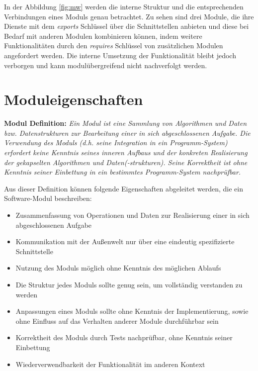     In der Abbildung \ref{fig:mw} werden die interne Struktur und die entsprechenden Verbindungen eines Moduls genau betrachtet. Zu sehen sind drei Module, die ihre Dienste mit dem \textit{exports} Schlüssel über die Schnittstellen anbieten und diese bei Bedarf mit anderen Modulen kombinieren können, indem weitere Funktionalitäten durch den \textit{requires} Schlüssel von zusätzlichen Modulen angefordert werden. Die interne Umsetzung der Funktionalität bleibt jedoch verborgen und kann modulübergreifend nicht nachverfolgt werden. 

  \section{Moduleigenschaften} \label{sec:ME}

    \textbf{Modul Definition: } \textit {Ein Modul ist eine Sammlung von Algorithmen und Daten bzw. Datenstrukturen zur Bearbeitung einer in sich abgeschlossenen Aufgabe. Die Verwendung des Moduls (d.h. seine Integration in ein Programm-System) erfordert keine Kenntnis seines inneren Aufbaus und der konkreten Realisierung der gekapselten Algorithmen und Daten(-strukturen). Seine Korrektheit ist ohne Kenntnis seiner Einbettung in ein bestimmtes Programm-System nachprüfbar.} \cite{rechenberg2006informatik}\bigbreak 

    Aus dieser Definition können folgende Eigenschaften abgeleitet werden, die ein Software-Modul beschreiben:

    \begin{itemize}
      \item Zusammenfassung von Operationen und Daten zur Realisierung einer in sich abgeschlossenen Aufgabe 
      \item Kommunikation mit der Außenwelt nur über eine eindeutig spezifizierte Schnittstelle 
      \item Nutzung des Moduls möglich ohne Kenntnis des möglichen Ablaufs 
      \item Die Struktur jedes Moduls sollte genug sein, um vollständig verstanden zu werden
      \item Anpassungen eines Moduls sollte ohne Kenntnis der Implementierung, sowie ohne Einfluss auf das Verhalten anderer Module durchführbar sein
      \item Korrektheit des Moduls durch Tests nachprüfbar, ohne Kenntnis seiner Einbettung
      \item Wiederverwendbarkeit der Funktionalität im anderen Kontext
    \end{itemize}

